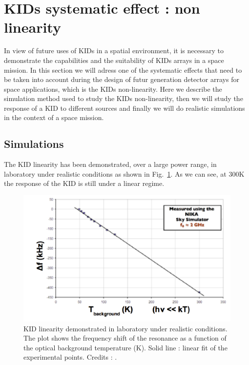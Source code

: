 
\section{KIDs systematic effect : non linearity}
\label{sec:KID-systematics}

In view of future uses of KIDs in a spatial environment, it is necessary to demonstrate the capabilities and the suitability of KIDs arrays in a space mission. In this section we will adress one of the systematic effects that need to be taken into account during the design of futur generation detector arrays for space applications, which is the KIDs non-linearity. Here we describe the simulation method used to study the KIDs non-linearity, then we will study the response of a KID to different sources and finally we will do realistic simulations in the context of a space mission.

\subsection{Simulations}

The KID linearity has been demonstrated, over a large power range, in laboratory under realistic conditions as shown in Fig.~\ref{KID-lin}. As we can see, at 300K the response of the KID is still under a linear regime.

\begin{figure}[h]
\center
\includegraphics[clip, angle=0, width=\columnwidth]{Figures/KID-linearity-Monfardini2014.png}
\caption{KID linearity demonstrated in laboratory under realistic conditions. The plot shows the frequency shift of the resonance as a function of the optical background temperature (K). Solid line : linear fit of the experimental points. Credits : \citet{2014JLTP..176..787M}.}
\label{KID-lin}
\end{figure}

